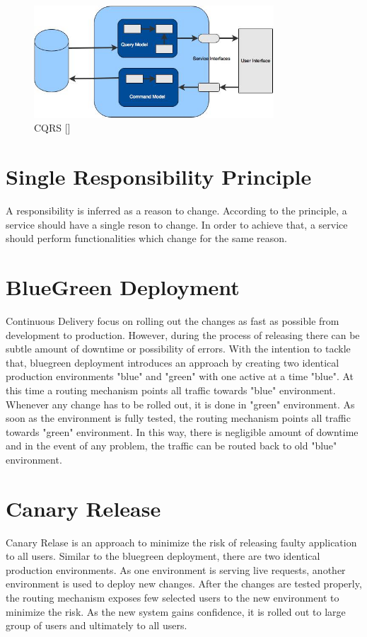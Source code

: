 \begin{figure}[H]
\begin{center}
\includegraphics[width=0.8\textwidth]{figures/Appendices_one_cqrs}
\caption{CQRS [\cite{Fowler:2011ab}]}
\label{fig:appendices/cqrs}
\end{center}
\end{figure}

\section{Single Responsibility Principle}\label{section:appendices/single_responsibility_principle}
A responsibility is inferred as a reason to change. According to the principle, a service should have a single reson to change. In order to achieve that, a service should perform functionalities which change for the same reason. \cite{Martin:2009aa} \cite{Stine:2014aa}

\section{BlueGreen Deployment}\label{section:appendices/blue_green_deployment}
Continuous Delivery focus on rolling out the changes as fast as possible from development to production. However, during the process of releasing there can be subtle amount of downtime or possibility of errors. With the intention to tackle that, bluegreen deployment introduces an approach by creating two identical production environments "blue" and "green" with one active at a time "blue". At this time a routing mechanism points all traffic towards "blue" environment. Whenever any change has to be rolled out, it is done in "green" environment. As soon as the environment is fully tested, the routing mechanism points all traffic towards "green" environment. In this way, there is negligible amount of downtime and in the event of any problem, the traffic can be routed back to old "blue" environment.

\section{Canary Release}\label{section:appendices/canary_release}
Canary Relase is an approach to minimize the risk of releasing faulty application to all users. Similar to the bluegreen deployment, there are two identical production environments. As one environment is serving live requests, another environment is used to deploy new changes. After the changes are tested properly, the routing mechanism exposes few selected users to the new environment to minimize the risk. As the new system gains confidence, it is rolled out to large group of users and ultimately to all users.